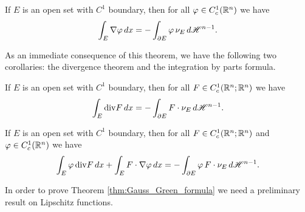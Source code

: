 \begin{theorem} \label{thm:Gauss_Green_formula}
If $E$ is an open set with $C^{1}$ boundary, then for all $\varphi \in C^{1}_{c}(\mathbb{R}^{n})$ we have
\begin{equation} \label{eq:Gauss_Green_formula}
\int_{E} \nabla \varphi \,dx = - \int_{\partial E} \varphi \, \nu_{E} \, d \mathscr{H}^{n - 1}.
\end{equation}
\end{theorem}

As an immediate consequence of this theorem, we have the following two corollaries: the divergence theorem and the integration by parts formula.

\begin{corollary} \label{cor:divergence_theorem}
If $E$ is an open set with $C^{1}$ boundary, then for all $F \in C^{1}_{c}(\mathbb{R}^{n}; \mathbb{R}^{n})$ we have
\begin{equation} \label{eq:divergence_theorem}
\int_{E} \mathrm{div} F \,dx = - \int_{\partial E} F \cdot \nu_{E} \, d \mathscr{H}^{n - 1}.
\end{equation}
\end{corollary}

\begin{corollary} \label{cor:integration_parts_formula}
If $E$ is an open set with $C^{1}$ boundary, then for all $F \in C^{1}_{c}(\mathbb{R}^{n}; \mathbb{R}^{n})$ and $\varphi \in C^{1}_{c}(\mathbb{R}^{n})$ we have
\begin{equation} \label{eq:integration_parts_formula}
\int_{E} \varphi \, \mathrm{div} F \, dx + \int_{E} F \cdot \nabla \varphi \, dx = - \int_{\partial E} \varphi \, F \cdot \nu_{E} \, d \mathscr{H}^{n - 1}.
\end{equation}
\end{corollary}

In order to prove Theorem \ref{thm:Gauss_Green_formula} we need a preliminary result on Lipschitz functions.

